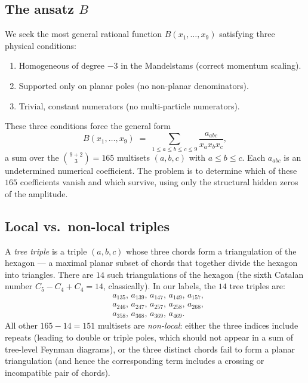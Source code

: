 \documentclass[11pt]{article}
\theoremstyle{definition}
\begin{document}
\subsection{The ansatz $B$}

We seek the most general rational function $B(x_1,\dots,x_9)$ satisfying three
physical conditions:
\begin{enumerate}[nosep,leftmargin=*]
  \item Homogeneous of degree $-3$ in the Mandelstams (correct momentum scaling).
  \item Supported only on planar poles (no non-planar denominators).
  \item Trivial, constant numerators (no multi-particle numerators).
\end{enumerate}
These three conditions force the general form
\begin{equation}
\label{eq:ansatz}
B(x_1,\dots,x_9) \;=\; \sum_{1\le a\le b\le c\le 9}\frac{a_{abc}}{x_a x_b x_c},
\end{equation}
a sum over the $\binom{9+2}{3}=165$ multisets $(a,b,c)$ with $a\le b\le c$.
Each $a_{abc}$ is an undetermined numerical coefficient. The problem is
to determine which of these $165$ coefficients vanish and which survive, using
only the structural hidden zeros of the amplitude.

\subsection{Local vs.\ non-local triples}

A \emph{tree triple} is a triple $(a,b,c)$ whose three chords form a
triangulation of the hexagon --- a maximal planar subset of chords that
together divide the hexagon into triangles. There are $14$ such triangulations
of the hexagon (the sixth Catalan number $C_5 - C_4 + C_4 = 14$, classically).
In our labels, the $14$ tree triples are:
\begin{equation}
\label{eq:trees}
\begin{aligned}
&a_{135},\,a_{139},\,a_{147},\,a_{149},\,a_{157},\\
&a_{246},\,a_{247},\,a_{257},\,a_{258},\,a_{268},\\
&a_{358},\,a_{368},\,a_{369},\,a_{469}.
\end{aligned}
\end{equation}
All other $165-14=151$ multisets are \emph{non-local}: either the three indices
include repeats (leading to double or triple poles, which should not appear in
a sum of tree-level Feynman diagrams), or the three distinct chords fail to
form a planar triangulation (and hence the corresponding term includes a
crossing or incompatible pair of chords).
\end{document}

